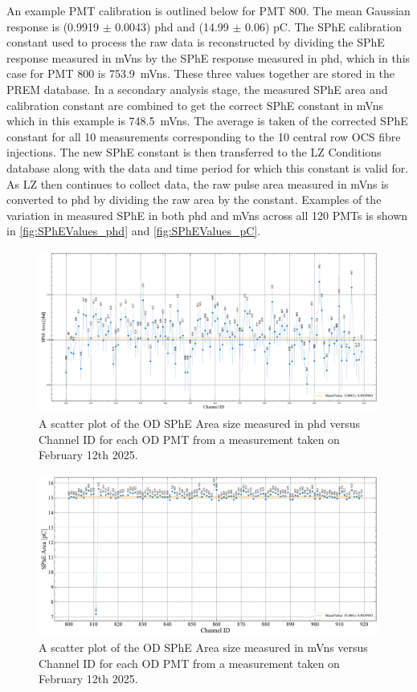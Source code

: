 An example PMT calibration is outlined below for PMT 800. The mean Gaussian response is (0.9919 $\pm$ 0.0043) phd and (14.99 $\pm$ 0.06) pC. The SPhE calibration constant used to process the raw data is reconstructed by dividing the SPhE response measured in mVns by the SPhE response measured in phd, which in this case for PMT 800 is 753.9~mVns. These three values together are stored in the PREM database. In a secondary analysis stage, the measured SPhE area and calibration constant are combined to get the correct SPhE constant in mVns which in this example is 748.5~mVns. The average is taken of the corrected SPhE constant for all 10 measurements corresponding to the 10 central row OCS fibre injections. The new SPhE constant is then transferred to the LZ Conditions database along with the data and time period for which this constant is valid for. As LZ then continues to collect data, the raw pulse area measured in mVns is converted to phd by dividing the raw area by the constant. Examples of the variation in measured SPhE in both phd and mVns across all 120 PMTs is shown in \autoref{fig:SPhEValues_phd} and \autoref{fig:SPhEValues_pC}.
\begin{figure}
    \centering
    \includegraphics[width=\textwidth]{figures/ODCommissioning/SPHE_phd_2025-2-12.pdf}
    \caption{A scatter plot of the OD SPhE Area size measured in phd versus Channel ID for each OD PMT from a measurement taken on February 12th 2025.}
    \label{fig:SPhEValues_phd}
\end{figure}
\begin{figure}
    \centering
    \includegraphics[width=\textwidth]{figures/ODCommissioning/SPHE_pC_2025-2-12.pdf}
    \caption{A scatter plot of the OD SPhE Area size measured in mVns versus Channel ID for each OD PMT from a measurement taken on February 12th 2025.}
    \label{fig:SPhEValues_pC}
\end{figure}
